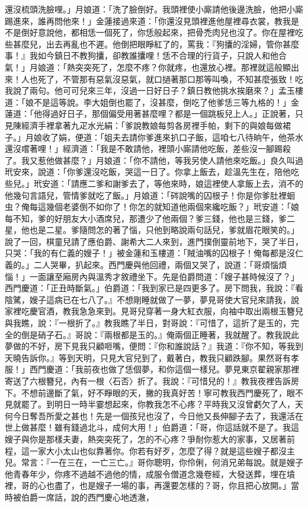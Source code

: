 \begin{showcontents}{}
還沒梳頭洗臉哩。」月娘道：「洗了臉倒好。我頭裡使小廝請他後邊洗臉，他把小廝踢進來，誰再問他來！」金蓮接過來道：「你還沒見頭裡進他屋裡尋衣裳，教我是不是倒好意說他，都相恁一個死了，你恁般起來，把骨禿肉兒也沒了。你在屋裡吃些甚麼兒，出去再亂也不遲。他倒把眼睜紅了的，罵我：『狗攮的淫婦，管你甚麼事！』我如今鎮日不教狗攮，卻教誰攮哩！恁不合理的行貨子，只說人和他合氣！」月娘道：「熱突突死了，怎麼不疼？你就疼，也還放心裡。那裡就這般顯出來！人也死了，不管那有惡氣沒惡氣，就口撾著那口那等叫喚，不知甚麼張致！吃我說了兩句。他可可兒來三年，沒過一日好日子？鎮日教他挑水挨磨來？」孟玉樓道：「娘不是這等說。李大姐倒也罷了，沒甚麼，倒吃了他爹恁三等九格的！」金蓮道：「他得過好日子，那個偏受用著甚麼哩？都是一個跳板兒上人。」正說著，只見陳經濟手裡拿著九疋水光絹：「爹說教娘每剪各房裡手帕，剩下的與娘每做裙子。」月娘收了娟，便道：「姐夫去請你爹進來扒口子飯，這咱七八待晌午，他茶水還沒嚐著哩！」經濟道：「我是不敢請他，裡頭小廝請他吃飯，差些沒一腳踢殺了。我又惹他做甚麼？」月娘道：「你不請他，等我另使人請他來吃飯。」良久叫過玳安來，說道：「你爹還沒吃飯，哭這一日了。你拿上飯去，趁溫先生在，陪他吃些兒。」玳安道：「請應二爹和謝爹去了，等他來時，娘這裡使人拿飯上去，消不的他幾句言語兒，管情爹就吃了飯。」月娘道：「硶說嘴的囚根子！你是你爹肚裡蛔虫？俺每這幾個老婆倒不如你了！你怎的就知道他兩個來纔吃飯？」玳安道：「娘每不知，爹的好朋友大小酒席兒，那遭少了他兩個？爹三錢，他也是三錢，爹二星，他也是二星。爹隨問怎的著了惱，只他到略說兩句話兒，爹就眉花眼笑的。」說了一回，棋童兒請了應伯爵、謝希大二人來到，進門撲倒靈前地下，哭了半日，只哭：「我的有仁義的嫂子！」被金蓮和玉樓道：「賊油嘴的囚根子！俺每都是沒仁義的。」二人哭畢，扒起來。西門慶與他回禮，兩個又哭了，說道：「哥煩惱煩惱！」一面讓至廂房內與溫秀才敘禮坐下。先是伯爵問道：「嫂子甚時候沒了？」西門慶道：「正丑時斷氣。」伯爵道：「我到家已是四更多了。房下問我，我說：『看陰騭，嫂子這病已在七八了。』不想剛睡就做了一夢，夢見哥使大官兒來請我，說家裡吃慶官酒，教我急急來到。見哥兒穿著一身大紅衣服，向袖中取出兩根玉簪兒與我瞧，說：『一根折了。』教我瞧了半日，對哥說：『可惜了，這折了是玉的，完全的倒是硝子石。』哥說：『兩根都是玉的。』俺兩個正睡著，我就醒了。教我說此夢做的不好，房下見我只顧咂嘴，便問：『你和誰說話？』我道：『你不知，等我到天曉告訴你。』等到天明，只見大官兒到了，戴著白，教我只顧跌腳。果然哥有孝服！」西門慶道：「我前夜也做了恁個夢，和你這個一樣兒。夢見東京翟親家那裡寄送了六根簪兒，內有一根〈石否〉折了。我說：『可惜兒的！』教我夜裡告訴房下。不想前邊斷了氣，好不睜眼的天，撇的我真好苦！寧可教我西門慶死了，眼不見就罷了。到明日一時半霎想起來，你教我怎不心疼？平時我又沒曾虧欠了人，天何今日奪吾所愛之甚也！先是一個孩兒也沒了，今日他又長伸腳子去了，我還活在世上做甚麼！雖有錢過北斗，成何大用！」伯爵道：「哥，你這話就不是了。我這嫂子與你是那樣夫妻，熱突突死了，怎的不心疼？爭耐你惹大的家事，又居著前程，這一家大小太山也似靠著你。你若有好歹，怎麼了得？就是這些嫂子都沒主兒。常言：『一在三在，一亡三亡。』哥你聰明，你伶俐，何消兄弟每說。就是嫂子他青春年少，你疼不過越不過他的情，成服令僧道念幾卷經，大發送葬，埋在墳裡，哥的心也盡了，也是嫂子一場的事，再還要怎樣的？哥，你且把心放開。」當時被伯爵一席話，說的西門慶心地透澈，
\end{showcontents}
